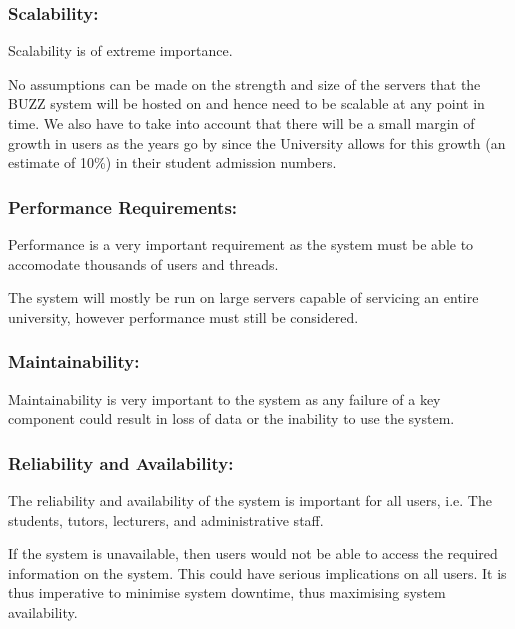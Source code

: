 
	\subsubsection{Scalability:} 
Scalability is of extreme importance.

No assumptions can be made on the strength and size of the servers that the BUZZ system will be hosted on and hence need to be scalable at any point in time. We also have to take into account that there will be a small margin of growth in users as the years go by since the University allows for this growth (an estimate of 10\%) in their student admission numbers.

	\subsubsection{Performance Requirements:} 
Performance is a very important requirement as the system must be able to accomodate thousands of users and threads.

The system will mostly be run on large servers capable of servicing an entire university, however performance must still be considered.

	\subsubsection{Maintainability:} 
Maintainability is very important to the system as any failure of a key component could result in loss of data or the inability to use the system.

	\subsubsection{Reliability and Availability:} 
The reliability and availability of the system is important for all users, i.e. The students, tutors, lecturers, and administrative staff.

If the system is unavailable, then users would not be able to access the required information on the system. This could have serious implications on all users. It is thus imperative to minimise system downtime, thus maximising system availability.	
		
